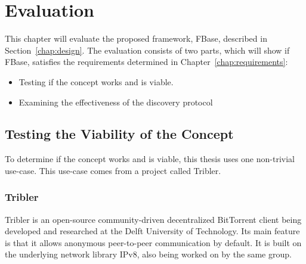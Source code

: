\chapter{\label{chap:evaluation}Evaluation}


This chapter will evaluate the proposed framework, FBase, described in Section~\ref{chap:design}. The evaluation consists of two parts, which will show if FBase, satisfies the requirements determined in Chapter~\ref{chap:requirements}:\newline

\begin{itemize}[nosep]
	\item Testing if the concept works and is viable.
	\item Examining the effectiveness of the discovery protocol%
\end{itemize}

\section{Testing the Viability of the Concept}

To determine if the concept works and is viable, this thesis uses one non-trivial use-case. This use-case comes from a project called Tribler.

\subsection{Tribler}

Tribler is an open-source community-driven decentralized BitTorrent client being developed and researched at the Delft University of Technology. Its main feature is that it allows anonymous peer-to-peer communication by default. It is built on the underlying network library IPv8, also being worked on by the same group.

